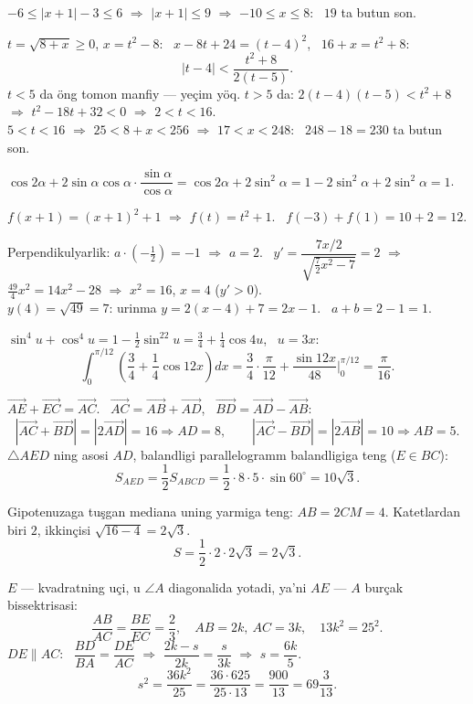 $-6\le|x+1|-3\le6$ $\Rightarrow$ $|x+1|\le9$ $\Rightarrow$ $-10\le x\le8$: \ $19$ ta butun son.

$t=\sqrt{8+x}\ge0$, $x=t^2-8$: \ $x-8t+24=(t-4)^2$, \ $16+x=t^2+8$:
\[|t-4|<\frac{t^2+8}{2(t-5)}.\]
$t<5$ da öng tomon manfiy — yeçim yöq. $t>5$ da: $2(t-4)(t-5)<t^2+8$ $\Rightarrow$ $t^2-18t+32<0$ $\Rightarrow$ $2<t<16$.\\
$5<t<16$ $\Rightarrow$ $25<8+x<256$ $\Rightarrow$ $17<x<248$: \ $248-18=230$ ta butun son.

$\cos2\alpha+2\sin\alpha\cos\alpha\cdot\dfrac{\sin\alpha}{\cos\alpha}=\cos2\alpha+2\sin^2\alpha=1-2\sin^2\alpha+2\sin^2\alpha=1$.

$f(x+1)=(x+1)^2+1$ $\Rightarrow$ $f(t)=t^2+1$. \ $f(-3)+f(1)=10+2=12$.

Perpendikulyarlik: $a\cdot\left(-\frac12\right)=-1$ $\Rightarrow$ $a=2$. \ $y'=\dfrac{7x/2}{\sqrt{\frac72x^2-7}}=2$ $\Rightarrow$ $\frac{49}4x^2=14x^2-28$ $\Rightarrow$ $x^2=16$, $x=4$ ($y'>0$).\\
$y(4)=\sqrt{49}=7$: urinma $y=2(x-4)+7=2x-1$. \ $a+b=2-1=1$.

$\sin^4u+\cos^4u=1-\frac12\sin^22u=\frac34+\frac14\cos4u$, \ $u=3x$:
\[\int_0^{\pi/12}\left(\frac34+\frac14\cos12x\right)dx=\frac34\cdot\frac\pi{12}+\frac{\sin12x}{48}\Big|_0^{\pi/12}=\frac\pi{16}.\]

$\overrightarrow{AE}+\overrightarrow{EC}=\overrightarrow{AC}$. \ $\overrightarrow{AC}=\overrightarrow{AB}+\overrightarrow{AD}$, \ $\overrightarrow{BD}=\overrightarrow{AD}-\overrightarrow{AB}$:
\[|\overrightarrow{AC}+\overrightarrow{BD}|=|2\overrightarrow{AD}|=16\Rightarrow AD=8,\qquad |\overrightarrow{AC}-\overrightarrow{BD}|=|2\overrightarrow{AB}|=10\Rightarrow AB=5.\]
$\triangle AED$ ning asosi $AD$, balandligi parallelogramm balandligiga teng ($E\in BC$):
\[S_{AED}=\frac12S_{ABCD}=\frac12\cdot8\cdot5\cdot\sin60^\circ=10\sqrt3.\]

Gipotenuzaga tuşgan mediana uning yarmiga teng: $AB=2CM=4$. Katetlardan biri $2$, ikkinçisi $\sqrt{16-4}=2\sqrt3$.
\[S=\frac12\cdot2\cdot2\sqrt3=2\sqrt3.\]

$E$ — kvadratning uçi, u $\angle A$ diagonalida yotadi, ya'ni $AE$ — $A$ burçak bissektrisasi:
\[\frac{AB}{AC}=\frac{BE}{EC}=\frac23,\quad AB=2k,\ AC=3k,\quad 13k^2=25^2.\]
$DE\parallel AC$: \ $\dfrac{BD}{BA}=\dfrac{DE}{AC}$ $\Rightarrow$ $\dfrac{2k-s}{2k}=\dfrac s{3k}$ $\Rightarrow$ $s=\dfrac{6k}5$.
\[s^2=\frac{36k^2}{25}=\frac{36\cdot625}{25\cdot13}=\frac{900}{13}=69\frac3{13}.\]

